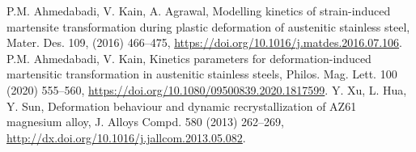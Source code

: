 \documentclass[a4paper, 11pt, dvipsnames]{article}
\begin{document}
\begin{thebibliography}{99}
 P.M. Ahmedabadi, V. Kain, A. Agrawal, Modelling kinetics of strain-induced martensite transformation during plastic deformation of austenitic stainless steel, Mater. Des. 109, (2016) 466--475, \url{https://doi.org/10.1016/j.matdes.2016.07.106}.
 P.M. Ahmedabadi, V. Kain, Kinetics parameters for deformation-induced martensitic transformation in austenitic stainless steels, Philos. Mag. Lett. 100 (2020) 555--560, \url{https://doi.org/10.1080/09500839.2020.1817599}.
 Y. Xu, L. Hua, Y. Sun, Deformation behaviour and dynamic recrystallization of AZ61 magnesium alloy, J. Alloys Compd. 580 (2013) 262--269, \url{http://dx.doi.org/10.1016/j.jallcom.2013.05.082}.
\end{thebibliography}
\clearpage
\listoffigures
\end{document}
